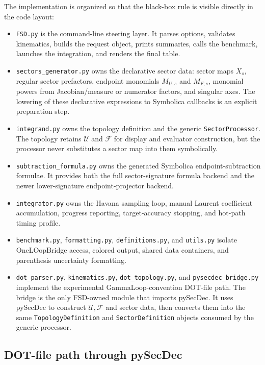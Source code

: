 \documentclass[11pt]{article}
\newcommand{\U}{\mathcal U}
\newcommand{\F}{\mathcal F}
\begin{document}
The implementation is organized so that the black-box rule is visible directly
in the code layout:
\begin{itemize}
  \item \texttt{FSD.py} is the command-line steering layer.  It parses options,
  validates kinematics, builds the request object, prints summaries, calls the
  benchmark, launches the integration, and renders the final table.
  \item \texttt{sectors\_generator.py} owns the declarative sector data:
  sector maps \(X_s\), regular sector prefactors, endpoint monomials
  \(M_{U,s}\) and \(M_{F,s}\), monomial powers from Jacobian/measure or
  numerator factors, and singular axes.  The lowering of these declarative
  expressions to Symbolica callbacks is an explicit preparation step.
  \item \texttt{integrand.py} owns the topology definition and the generic
  \texttt{SectorProcessor}.  The topology retains \(\U\) and \(\F\) for
  display and evaluator construction, but the processor never substitutes a
  sector map into them symbolically.
  \item \texttt{subtraction\_formula.py} owns the generated Symbolica
  endpoint-subtraction formulae.  It provides both the full sector-signature
  formula backend and the newer lower-signature endpoint-projector backend.
  \item \texttt{integrator.py} owns the Havana sampling loop, manual Laurent
  coefficient accumulation, progress reporting, target-accuracy stopping, and
  hot-path timing profile.
  \item \texttt{benchmark.py}, \texttt{formatting.py}, \texttt{definitions.py},
  and \texttt{utils.py} isolate OneLOopBridge access, colored output, shared
  data containers, and parenthesis uncertainty formatting.
  \item \texttt{dot\_parser.py}, \texttt{kinematics.py},
  \texttt{dot\_topology.py}, and \texttt{pysecdec\_bridge.py} implement the
  experimental GammaLoop-convention DOT-file path.  The bridge is the only
  FSD-owned module that imports pySecDec.  It uses pySecDec to construct
  \(\U,\F\) and sector data, then converts them into the same
  \texttt{TopologyDefinition} and \texttt{SectorDefinition} objects consumed
  by the generic processor.
\end{itemize}

\subsection{DOT-file path through pySecDec}
\end{document}
